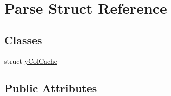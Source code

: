\hypertarget{struct_parse}{}\section{Parse Struct Reference}
\label{struct_parse}
\subsection*{Classes}
\begin{DoxyCompactItemize}
\item 
struct \mbox{\hyperlink{struct_parse_1_1y_col_cache}{y\+Col\+Cache}}
\end{DoxyCompactItemize}
\subsection*{Public Attributes}
